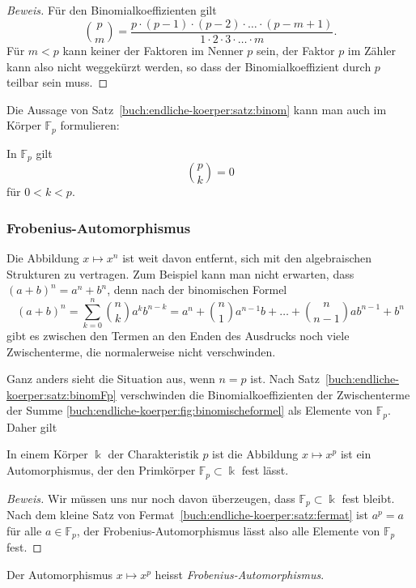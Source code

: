 \begin{proof}[Beweis]
Für den Binomialkoeffizienten gilt
\[
\binom{p}{m}
=
\frac{p\cdot (p-1)\cdot(p-2)\cdot\ldots\cdot (p-m+1)}{1\cdot 2\cdot 3\cdot\ldots\cdot m}.
\]
Für $m<p$ kann keiner der Faktoren im Nenner $p$ sein, der Faktor $p$
im Zähler kann also nicht weggekürzt werden, so dass der Binomialkoeffizient
durch $p$ teilbar sein muss.
\end{proof}

Die Aussage von Satz~\ref{buch:endliche-koerper:satz:binom} kann man 
auch im Körper $\mathbb{F}_p$ formulieren:

\begin{satz}
\label{buch:endliche-koerper:satz:binomFp}
In $\mathbb{F}_p$ gilt
\[
\binom{p}{k}=0
\]
für $0<k<p$.
\end{satz}

\subsubsection{Frobenius-Automorphismus}
Die Abbildung $x\mapsto x^n$ ist weit davon entfernt, sich mit den
algebraischen Strukturen zu vertragen.
Zum Beispiel kann man nicht erwarten, dass $(a+b)^n = a^n + b^n$,
denn nach der binomischen Formel
\begin{equation}
(a+b)^n
=
\sum_{k=0}^n \binom{n}{k} a^k b^{n-k}
=
a^n + \binom{n}{1}a^{n-1}b + \dots + \binom{n}{n-1}ab^{n-1} + b^n
\label{buch:endliche-koerper:fig:binomischeformel}
\end{equation}
gibt es zwischen den Termen an den Enden des Ausdrucks noch viele
Zwischenterme, die normalerweise nicht verschwinden.

Ganz anders sieht die Situation aus, wenn $n=p$ ist.
Nach Satz~\ref{buch:endliche-koerper:satz:binomFp} verschwinden die
Binomialkoeffizienten der Zwischenterme der Summe
\eqref{buch:endliche-koerper:fig:binomischeformel}
als Elemente von $\mathbb{F}_p$.
Daher gilt

\begin{satz}
In einem Körper $\Bbbk$ der Charakteristik $p$ ist die Abbildung
$x\mapsto x^p$ ist ein Automorphismus, der den Primkörper 
$\mathbb{F}_p\subset\Bbbk$ fest lässt.
\end{satz}

\begin{proof}[Beweis]
Wir müssen uns nur noch davon überzeugen, dass $\mathbb{F}_p\subset\Bbbk$
fest bleibt.
Nach dem kleine Satz von Fermat~\ref{buch:endliche-koerper:satz:fermat}
ist $a^p=a$ für alle $a\in\mathbb{F}_p$, der Frobenius-Automorphismus
lässt also alle Elemente von $\mathbb{F}_p$ fest.
\end{proof}

\begin{definition}
Der Automorphismus $x\mapsto x^p$ heisst {\em Frobenius-Automorphismus}.
\end{definition}
